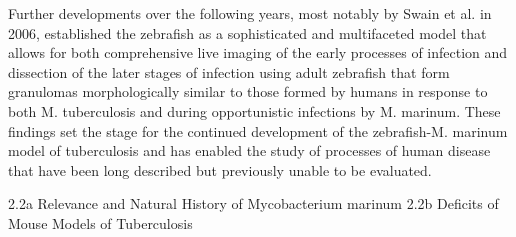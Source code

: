 Further developments over the following years, most notably by Swain et al. in 2006, established the zebrafish as a sophisticated and multifaceted model that allows for both comprehensive live imaging of the early processes of infection and dissection of the later stages of infection using adult zebrafish that form granulomas morphologically similar to those formed by humans in response to both M. tuberculosis and during opportunistic infections by M. marinum. These findings set the stage for the continued development of the zebrafish-M. marinum model of tuberculosis and has enabled the study of processes of human disease that have been long described but previously unable to be evaluated.

2.2a Relevance and Natural History of Mycobacterium marinum
2.2b Deficits of Mouse Models of Tuberculosis

